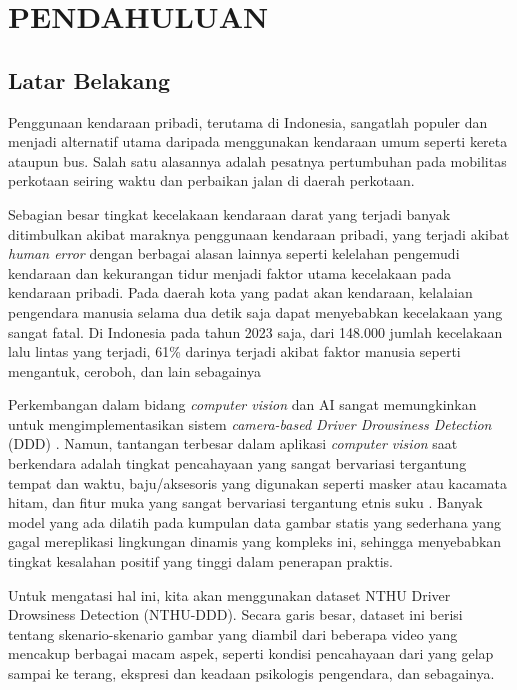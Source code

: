 \documentclass[11pt,a4paper,oneside]{report}
\begin{document}

\chapter{PENDAHULUAN}

\section{Latar Belakang}

Penggunaan kendaraan pribadi, terutama di Indonesia, sangatlah populer dan menjadi alternatif utama daripada menggunakan kendaraan umum seperti kereta ataupun bus. Salah satu alasannya adalah pesatnya pertumbuhan pada mobilitas perkotaan seiring waktu dan perbaikan jalan di daerah perkotaan. 

Sebagian besar tingkat kecelakaan kendaraan darat yang terjadi banyak ditimbulkan akibat maraknya penggunaan kendaraan pribadi, yang terjadi akibat \textit{human error} dengan berbagai alasan lainnya seperti kelelahan pengemudi kendaraan dan kekurangan tidur menjadi faktor utama kecelakaan pada kendaraan pribadi. Pada daerah kota yang padat akan kendaraan, kelalaian pengendara manusia selama dua detik saja dapat menyebabkan kecelakaan yang sangat fatal. Di Indonesia pada tahun 2023 saja, dari 148.000 jumlah kecelakaan lalu lintas yang terjadi, 61\% darinya terjadi akibat faktor manusia seperti mengantuk, ceroboh, dan lain sebagainya \cite{b1}

Perkembangan dalam bidang \textit{computer vision} dan AI sangat memungkinkan untuk mengimplementasikan sistem \textit{camera-based Driver Drowsiness Detection} (DDD) \cite{b2} \cite{b3}. Namun, tantangan terbesar dalam aplikasi \textit{computer vision} saat berkendara adalah tingkat pencahayaan yang sangat bervariasi tergantung tempat dan waktu, baju/aksesoris yang digunakan seperti masker atau kacamata hitam, dan fitur muka yang sangat bervariasi tergantung etnis suku \cite{b4} \cite{b5}. Banyak model yang ada dilatih pada kumpulan data gambar statis yang sederhana yang gagal mereplikasi lingkungan dinamis yang kompleks ini, sehingga menyebabkan tingkat kesalahan positif yang tinggi dalam penerapan praktis.

Untuk mengatasi hal ini, kita akan menggunakan dataset NTHU Driver Drowsiness Detection (NTHU-DDD). Secara garis besar, dataset ini berisi tentang skenario-skenario gambar yang diambil dari beberapa video yang mencakup berbagai macam aspek, seperti kondisi pencahayaan dari yang gelap sampai ke terang, ekspresi dan keadaan psikologis pengendara, dan sebagainya.
\end{document}
